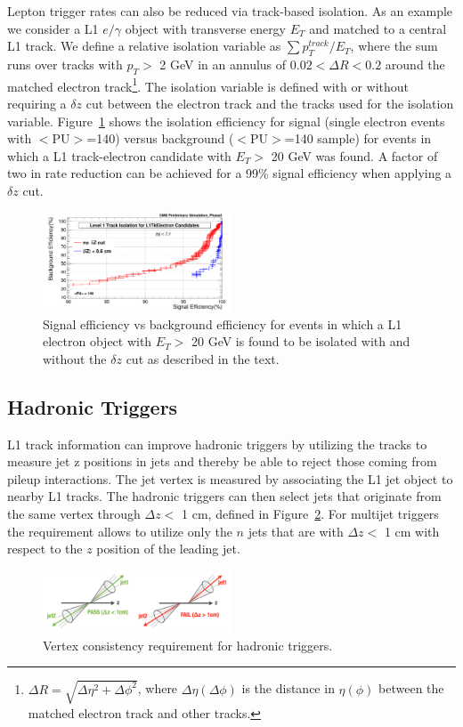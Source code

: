 \documentclass{PoS}
\begin{document}
Lepton trigger rates can also be reduced via track-based isolation. As an example we consider a L1 $e/\gamma$ object with transverse energy $E_T$ and matched to a central L1 track. We define a relative isolation variable as $\sum p^{track}_T/E_T$, where the sum runs over tracks with $p_T >$ 2 GeV in an annulus of $0.02 < \Delta R < 0.2$ around the matched electron track\footnote{$\Delta R = \sqrt{\Delta\eta^2 + \Delta\phi^2}$, where $\Delta\eta (\Delta\phi)$ is the distance in $\eta (\phi)$ between the matched electron track and other tracks.}. The isolation variable is defined with or without requiring a $\delta z$ cut between the electron track and the tracks used for the isolation variable. Figure~\ref{fig:Isolation} shows the isolation efficiency for signal (single electron events with $<$PU$>$=140) versus background ($<$PU$>$=140 sample) for events in which a L1 track-electron candidate with $E_T >$ 20 GeV was found. A factor of two in rate reduction can be achieved for a 99\% signal efficiency when applying a $\delta z$ cut.
\begin{figure}[h!]
  \centering
	\includegraphics[width=0.5\textwidth]{Figures/isoROC_SignalEt20-25-4.png}
	\caption{Signal efficiency vs background efficiency for events in which a L1 electron object with $E_T >$ 20 GeV is found to be isolated with and without the $\delta z$ cut as described in the text.}
	\label{fig:Isolation}
\end{figure}

\subsection{Hadronic Triggers}
L1 track information can improve hadronic triggers by utilizing the tracks to measure jet z positions in jets and thereby be able to reject those coming from pileup interactions. The jet vertex is measured by associating the L1 jet object to nearby L1 tracks. The hadronic triggers can then select jets that originate from the same vertex through $\Delta z <$ 1 cm, defined in Figure~\ref{fig:JetDeltaZ}. For multijet triggers the requirement allows to utilize only the $n$ jets that are with $\Delta z <$ 1 cm with respect to the $z$ position of the leading jet.
\begin{figure}[h!]
  \centering
	\includegraphics[width=0.5\textwidth]{Figures/JetDeltaZ.png}
	\caption{Vertex consistency requirement for hadronic triggers.}
	\label{fig:JetDeltaZ}
\end{figure}
\end{document}
